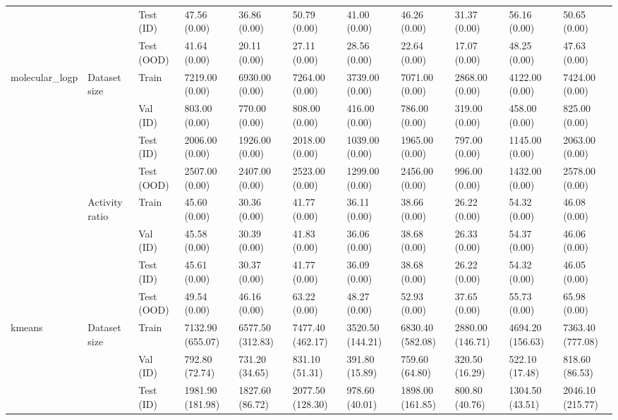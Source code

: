 \begin{tabular}{lllllllllll}
 &  & Test (ID) & 47.56 (0.00) & 36.86 (0.00) & 50.79 (0.00) & 41.00 (0.00) & 46.26 (0.00) & 31.37 (0.00) & 56.16 (0.00) & 50.65 (0.00) \\
 &  & Test (OOD) & 41.64 (0.00) & 20.11 (0.00) & 27.11 (0.00) & 28.56 (0.00) & 22.64 (0.00) & 17.07 (0.00) & 48.25 (0.00) & 47.63 (0.00) \\
\cline{1-11} \cline{2-11}
\multirow[t]{8}{*}{molecular_logp} & \multirow[t]{4}{*}{Dataset size} & Train & 7219.00 (0.00) & 6930.00 (0.00) & 7264.00 (0.00) & 3739.00 (0.00) & 7071.00 (0.00) & 2868.00 (0.00) & 4122.00 (0.00) & 7424.00 (0.00) \\
 &  & Val (ID) & 803.00 (0.00) & 770.00 (0.00) & 808.00 (0.00) & 416.00 (0.00) & 786.00 (0.00) & 319.00 (0.00) & 458.00 (0.00) & 825.00 (0.00) \\
 &  & Test (ID) & 2006.00 (0.00) & 1926.00 (0.00) & 2018.00 (0.00) & 1039.00 (0.00) & 1965.00 (0.00) & 797.00 (0.00) & 1145.00 (0.00) & 2063.00 (0.00) \\
 &  & Test (OOD) & 2507.00 (0.00) & 2407.00 (0.00) & 2523.00 (0.00) & 1299.00 (0.00) & 2456.00 (0.00) & 996.00 (0.00) & 1432.00 (0.00) & 2578.00 (0.00) \\
\cline{2-11}
 & \multirow[t]{4}{*}{Activity ratio} & Train & 45.60 (0.00) & 30.36 (0.00) & 41.77 (0.00) & 36.11 (0.00) & 38.66 (0.00) & 26.22 (0.00) & 54.32 (0.00) & 46.08 (0.00) \\
 &  & Val (ID) & 45.58 (0.00) & 30.39 (0.00) & 41.83 (0.00) & 36.06 (0.00) & 38.68 (0.00) & 26.33 (0.00) & 54.37 (0.00) & 46.06 (0.00) \\
 &  & Test (ID) & 45.61 (0.00) & 30.37 (0.00) & 41.77 (0.00) & 36.09 (0.00) & 38.68 (0.00) & 26.22 (0.00) & 54.32 (0.00) & 46.05 (0.00) \\
 &  & Test (OOD) & 49.54 (0.00) & 46.16 (0.00) & 63.22 (0.00) & 48.27 (0.00) & 52.93 (0.00) & 37.65 (0.00) & 55.73 (0.00) & 65.98 (0.00) \\
\cline{1-11} \cline{2-11}
\multirow[t]{8}{*}{kmeans} & \multirow[t]{4}{*}{Dataset size} & Train & 7132.90 (655.07) & 6577.50 (312.83) & 7477.40 (462.17) & 3520.50 (144.21) & 6830.40 (582.08) & 2880.00 (146.71) & 4694.20 (156.63) & 7363.40 (777.08) \\
 &  & Val (ID) & 792.80 (72.74) & 731.20 (34.65) & 831.10 (51.31) & 391.80 (15.89) & 759.60 (64.80) & 320.50 (16.29) & 522.10 (17.48) & 818.60 (86.53) \\
 &  & Test (ID) & 1981.90 (181.98) & 1827.60 (86.72) & 2077.50 (128.30) & 978.60 (40.01) & 1898.00 (161.85) & 800.80 (40.76) & 1304.50 (43.51) & 2046.10 (215.77) \\

\end{tabular}
